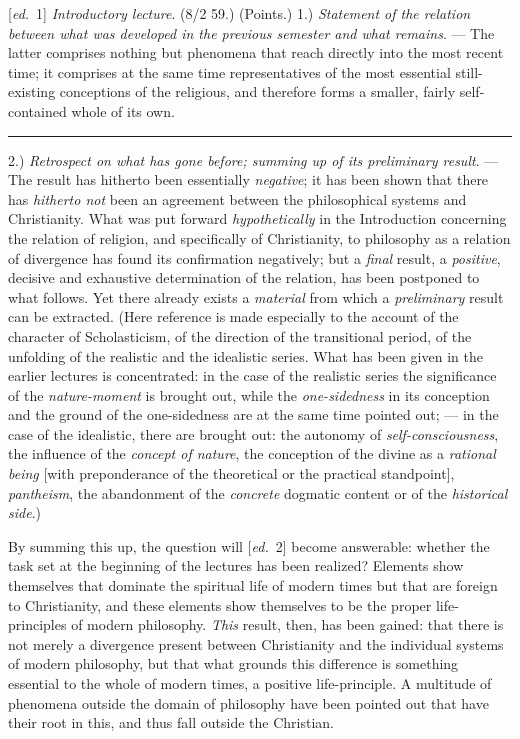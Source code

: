 \documentclass[12pt,a4paper,openany]{book}
\newcommand{\kpage}[1]{\marginnote{\footnotesize\textit{[#1]}}}
\newcommand{\ed}[1]{{\small[\textit{ed.}\ #1]}}
\newcommand{\sepline}{\par\begin{center}\rule{2cm}{0.4pt}\end{center}\par}
\begin{document}
\ed{1} \emph{Introductory lecture}. (8/2 59.)
(Points.)
1.) \emph{Statement of the relation between what was developed in the previous semester and what
remains}. --- The latter comprises nothing but phenomena that reach directly
into the most recent time; it comprises at the same time representatives of
\kpage{93}the most essential still-existing conceptions of the religious, and
therefore forms a smaller, fairly self-contained whole of its own.

\sepline

2.) \emph{Retrospect on what has gone before; summing up of its preliminary result}. ---
The result has hitherto been essentially \emph{negative}; it has been shown that there
has \emph{hitherto not} been an agreement between the philosophical
systems and Christianity. What was put forward \emph{hypothetically} in the Introduction
concerning the relation of religion, and specifically of Christianity,
to philosophy as a relation of divergence has found its
confirmation negatively; but a \emph{final} result, a \emph{positive}, decisive
and exhaustive determination of the relation, has been postponed to what
follows. Yet there already exists a \emph{material} from which a
\emph{preliminary} result can be extracted. (Here reference is made especially to the account
of the character of Scholasticism, of the direction of the transitional period, of
the unfolding of the realistic and the idealistic series. What has been given in the
earlier lectures is concentrated: in the case of the realistic
series the significance of the \emph{nature-moment} is brought out, while the \emph{one-sidedness} in its
conception and the ground of the one-sidedness are at the same time pointed out; --- in the case of the
idealistic, there are brought out: the autonomy of \emph{self-consciousness}, the influence of the \emph{concept of nature},
the conception of the divine as a \emph{rational being} [with
preponderance of the theoretical or the practical standpoint], \emph{pantheism},
the abandonment of the \emph{concrete} dogmatic content or of the \emph{historical side}.)

By summing this up, the question will \ed{2} become answerable:
whether the task set at the beginning of the lectures
has been realized? Elements show themselves that dominate the spiritual life of modern times
but that are foreign to Christianity, and these
elements show themselves to be the proper life-principles of modern philosophy.
\emph{This} result, then, has been gained: that there is not merely a divergence
present between Christianity and the individual systems of modern philosophy,
but that what grounds this difference is
something essential to the whole of modern times, a positive life-principle. A
multitude of phenomena outside the domain of philosophy have been pointed out
that have their root in this, and thus fall outside the Christian.
\end{document}
